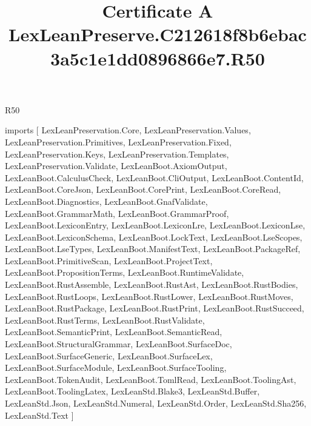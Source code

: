 \begin{lexlean}{R50}
\title{Certificate A LexLeanPreserve.C212618f8b6ebac3a5c1e1dd0896866e7.R50}
\begin{coremodule}
imports [
  LexLeanPreservation.Core,
  LexLeanPreservation.Values,
  LexLeanPreservation.Primitives,
  LexLeanPreservation.Fixed,
  LexLeanPreservation.Keys,
  LexLeanPreservation.Templates,
  LexLeanPreservation.Validate,
  LexLeanBoot.AxiomOutput,
  LexLeanBoot.CalculusCheck,
  LexLeanBoot.CliOutput,
  LexLeanBoot.ContentId,
  LexLeanBoot.CoreJson,
  LexLeanBoot.CorePrint,
  LexLeanBoot.CoreRead,
  LexLeanBoot.Diagnostics,
  LexLeanBoot.GnafValidate,
  LexLeanBoot.GrammarMath,
  LexLeanBoot.GrammarProof,
  LexLeanBoot.LexiconEntry,
  LexLeanBoot.LexiconLre,
  LexLeanBoot.LexiconLse,
  LexLeanBoot.LexiconSchema,
  LexLeanBoot.LockText,
  LexLeanBoot.LseScopes,
  LexLeanBoot.LseTypes,
  LexLeanBoot.ManifestText,
  LexLeanBoot.PackageRef,
  LexLeanBoot.PrimitiveScan,
  LexLeanBoot.ProjectText,
  LexLeanBoot.PropositionTerms,
  LexLeanBoot.RuntimeValidate,
  LexLeanBoot.RustAssemble,
  LexLeanBoot.RustAst,
  LexLeanBoot.RustBodies,
  LexLeanBoot.RustLoops,
  LexLeanBoot.RustLower,
  LexLeanBoot.RustMoves,
  LexLeanBoot.RustPackage,
  LexLeanBoot.RustPrint,
  LexLeanBoot.RustSucceed,
  LexLeanBoot.RustTerms,
  LexLeanBoot.RustValidate,
  LexLeanBoot.SemanticPrint,
  LexLeanBoot.SemanticRead,
  LexLeanBoot.StructuralGrammar,
  LexLeanBoot.SurfaceDoc,
  LexLeanBoot.SurfaceGeneric,
  LexLeanBoot.SurfaceLex,
  LexLeanBoot.SurfaceModule,
  LexLeanBoot.SurfaceTooling,
  LexLeanBoot.TokenAudit,
  LexLeanBoot.TomlRead,
  LexLeanBoot.ToolingAst,
  LexLeanBoot.ToolingLatex,
  LexLeanStd.Blake3,
  LexLeanStd.Buffer,
  LexLeanStd.Json,
  LexLeanStd.Numeral,
  LexLeanStd.Order,
  LexLeanStd.Sha256,
  LexLeanStd.Text
]


\end{coremodule}
\end{lexlean}
